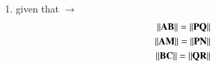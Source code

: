 \begin{enumerate}[label=\thesection.\arabic*.,ref=\thesection.\theenumi]
	
\item 	given that $\to$
\begin{align}
\left\lVert\mathbf{AB}\right\rVert = \left\lVert\mathbf{PQ}\right\rVert\\
\left\lVert\mathbf{AM}\right\rVert = \left\lVert\mathbf{PN}\right\rVert\\
\left\lVert\mathbf{BC}\right\rVert = \left\lVert\mathbf{QR}\right\rVert	
\end{align}

%
\end{enumerate}
